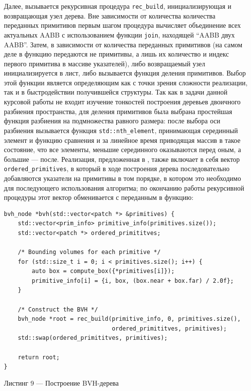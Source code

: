 \documentclass[12pt]{article}
\begin{document}
Далее, вызывается рекурсивная процедура \texttt{rec\_build}, инициализирующая и возвращающая узел дерева. Вне зависимости от количества количества переданных примитивов первым шагом процедура вычисляет объединение всех актуальных AABB с использованием функции \texttt{join}, находящей ``AABB двух AABB''. Затем, в зависимости от количества переданных примитивов (на самом деле в функцию передаются не примитивы, а лишь их количество и индекс первого примитива в массиве указателей), либо возвращаемый узел инициализируется в лист, либо вызывается функция деления примитивов. Выбор этой функции является определяющим как с точки зрения сложности реализации, так и в быстродействии получившейся структуры. Так как в задачи данной курсовой работы не входит изучение тонкостей построения деревьев двоичного разбиения пространства, для деления примитивов была выбрана простейшая функция разбиения на подмножества равного размера: после выбора оси разбиения вызывается функция \texttt{std::nth\_element}, принимающая серединный элемент и функцию сравнения и за линейное время приводящая массив в такое состояние, что все элементы, меньшие серединного оказываются перед оным, а большие --- после. Реализация, предложенная в \cite{Pha17}, также включает в себя вектор \texttt{ordered\_primitives}, в который в ходе построения дерева последовательно добавляются указатели на примитивы в том порядке, в котором это необходимо для последующего использования алгоритма; по окончанию работы рекурсивной процедуры этот вектор обменивается с переданным в функцию:
\begin{lstlisting}
bvh_node *bvh(std::vector<patch *> &primitives) {
    std::vector<prim_info> primitive_info(primitives.size());
    std::vector<patch *> ordered_primititves;

    /* Bounding volumes for each primitive */
    for (std::size_t i = 0; i < primitives.size(); i++) {
        auto box = compute_box({*primitives[i]});
        primitive_info[i] = {i, box, (box.near + box.far) / 2.0f};
    }

    /* Construct the BVH */
    bvh_node *root = rec_build(primitive_info, 0, primitives.size(), 
                               ordered_primititves, primitives);
    std::swap(ordered_primititves, primitives);

    return root;
}
\end{lstlisting}
\begin{center}Листинг 9 --- Построение BVH-дерева \end{center}
\end{document}
